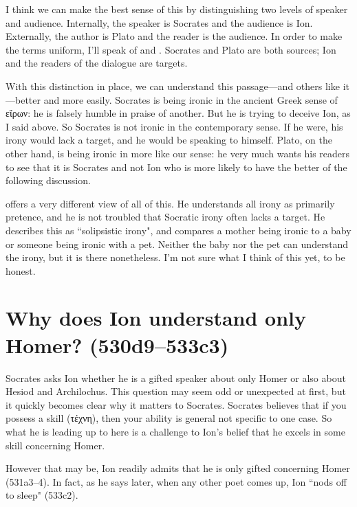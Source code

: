\documentclass[11pt]{article}
\begin{document}
I think we can make the best sense of this by distinguishing two levels of
speaker and audience.  Internally, the speaker is Socrates and the audience
is Ion.  Externally, the author is Plato and the reader is the audience.
In order to make the terms uniform, I'll speak of  and
.  Socrates and Plato are both sources; Ion and the readers of
the dialogue are targets.

With this distinction in place, we can understand this passage---and others
like it---better and more easily.  Socrates is being ironic in the ancient
Greek sense of {\g εἴρων}: he is falsely humble in praise of another.  But
he is trying to deceive Ion, as I said above.  So Socrates is not ironic in
the contemporary sense.  If he were, his irony would lack a target, and he
would be speaking to himself.  Plato, on the other hand, is being ironic in
more like our sense: he very much wants his readers to see that it is
Socrates and not Ion who is more likely to have the better of the following
discussion.

\citet{ferrari2008} offers a very different view of all of this.  He
understands all irony as primarily pretence, and he is not troubled that
Socratic irony often lacks a target.  He describes this as ``solipsistic
irony", and compares a mother being ironic to a baby or someone being
ironic with a pet.  Neither the baby nor the pet can understand the irony,
but it is there nonetheless.  I'm not sure what I think of this yet, to be
honest.


\section{Why does Ion understand only Homer? (530d9--533c3)}

Socrates asks Ion whether he is a gifted speaker about only Homer or also
about Hesiod and Archilochus.  This question may seem odd or unexpected at
first, but it quickly becomes clear why it matters to Socrates.  Socrates
believes that if you possess a skill ({\g τέχνη}), then your ability is general
not specific to one case.  So what he is leading up to here is a challenge
to Ion's belief that he excels in some skill concerning Homer.

However that may be, Ion readily admits that he is only gifted concerning
Homer (531a3--4).  In fact, as he says later, when any other poet comes up,
Ion ``nods off to sleep" (533c2).
\end{document}
